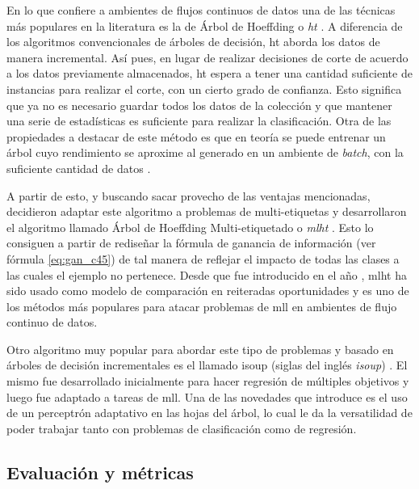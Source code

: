 En lo que confiere a ambientes de flujos continuos de datos una de las técnicas
más populares en la literatura es la de Árbol de Hoeffding o
\textit{\acrfull{ht}} \cite{domingos_mining_2002}. A diferencia de los
algoritmos convencionales de árboles de decisión, \acrlong{ht} aborda los datos
de manera incremental. Así pues, en lugar de realizar decisiones de corte de
acuerdo a los datos previamente almacenados, \acrshort{ht} espera a tener una
cantidad suficiente de instancias para realizar el corte, con un cierto grado de
confianza. Esto significa que ya no es necesario guardar todos los datos de la
colección y que mantener una serie de estadísticas es suficiente para realizar
la clasificación. Otra de las propiedades a destacar de este método es que en
teoría se puede entrenar un árbol cuyo rendimiento se aproxime al generado en un
ambiente de \textit{batch}, con la suficiente cantidad de datos
\cite{bifet_machine_2018}. 

A partir de esto, y buscando sacar provecho de las ventajas mencionadas,
\citeauthor{read_scalable_2012} decidieron adaptar este algoritmo a problemas de
multi-etiquetas y desarrollaron el algoritmo llamado Árbol de Hoeffding
Multi-etiquetado o \textit{\acrfull{mlht}} \cite{read_scalable_2012}. Esto lo
consiguen a partir de rediseñar la fórmula de ganancia de información (ver
fórmula \ref{eq:gan_c45}) de tal manera de reflejar el impacto de todas las
clases a las cuales el ejemplo no pertenece. Desde que fue introducido en el año
\citeyear{read_scalable_2012}, \acrshort{mlht} ha sido usado como modelo de
comparación en reiteradas oportunidades \cite{sousa_multi-label_2018} y es uno
de los métodos más populares para atacar problemas de \acrshort{mll} en
ambientes de flujo continuo de datos.

Otro algoritmo muy popular para abordar este tipo de problemas y basado en
árboles de decisión incrementales es el llamado \acrshort{isoup} (siglas del
inglés \textit{\acrlong{isoup}}) \cite{osojnik_multi-label_2017}. El mismo fue
desarrollado inicialmente para hacer regresión de múltiples objetivos y luego
fue adaptado a tareas de \acrshort{mll}. Una de las novedades que introduce es
el uso de un perceptrón adaptativo en las hojas del árbol, lo cual le da la
versatilidad de poder trabajar tanto con problemas de clasificación como de
regresión.


\subsection{Evaluación y métricas}
\label{mll_evaluacion}

